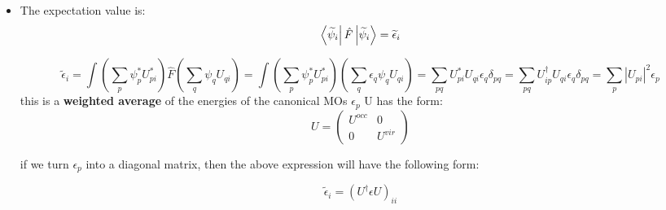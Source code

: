 \documentclass{article}
\begin{document}
\begin{itemize}
    \item The expectation value is: 
    \[
    \bra{\widetilde{\psi}_i}\hat{F}\ket{\widetilde{\psi}_i} = \widetilde{\epsilon}_i
    \]

    \[
    \widetilde{\epsilon}_i = \int (\sum_{p} \psi_{p}^{*} U_{pi}^{*}) \hat{F}(\sum_{q} \psi_{q} U_{qi}) =
    \int (\sum_{p} \psi_{p}^{*} U_{pi}^{*})(\sum_{q} \epsilon_q \psi_{q} U_{qi}) =
    \sum_{pq} U_{pi}^{*}U_{qi}\epsilon_{q}\delta_{pq} = \sum_{pq} U_{ip}^{\dagger}U_{qi}\epsilon_{q}\delta_{pq} = \sum_{p} |U_{pi}|^{2}\epsilon_{p}
    \]
    this is a \textbf{weighted average} of the energies of the canonical MOs $\epsilon_p$
    U has the form:
    \[ U =  
    \begin{pmatrix}
    U^{occ} & 0 \\
    0 & U^{vir}
    \end{pmatrix}   
    \]

    if we turn $\epsilon_p$ into a diagonal matrix, then the above expression will have the following form:

    \[
    \widetilde{\epsilon}_i = (U^{\dagger}\epsilon U)_{ii}
    \]

\end{itemize}
\end{document}

